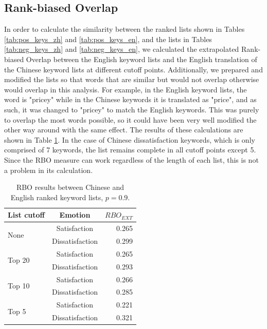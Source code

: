 \subsection{Rank-biased Overlap}\label{rboresults}

In order to calculate the similarity between the ranked lists shown in Tables \ref{tab:pos_keys_zh} and \ref{tab:pos_keys_en}, and the lists in Tables \ref{tab:neg_keys_zh} and \ref{tab:neg_keys_en}, we calculated the extrapolated Rank-biased Overlap between the English keyword lists and the English translation of the Chinese keyword lists at different cutoff points. Additionally, we prepared and modified the lists so that words that are similar but would not overlap otherwise would overlap in this analysis. For example, in the English keyword lists, the word is "pricey" while in the Chinese keywords it is translated as "price", and as such, it was changed to "pricey" to match the English keywords. This was purely to overlap the most words possible, so it could have been very well modified the other way around with the same effect. The results of these calculations are shown in Table \ref{tab:rbo}. In the case of Chinese dissatisfaction keywords, which is only comprised of 7 keywords, the list remains complete in all cutoff points except 5. Since the RBO measure can work regardless of the length of each list, this is not a problem in its calculation.

\begin{table}[hbp]
\centering
\caption{RBO results between Chinese and English ranked keyword lists, \(p=0.9\).}
\label{tab:rbo}
\begin{tabular}{|l|c|r|}
\hline
\multicolumn{1}{|c|}{\textbf{List cutoff}} & \textbf{Emotion} & \(RBO_{EXT}\) \\ \hline
\multirow{2}{*}{None}   & Satisfaction      & 0.265 \\ \cline{2-3} 
                        & Dissatisfaction   & 0.299 \\ \hline
\multirow{2}{*}{Top 20} & Satisfaction      & 0.265 \\ \cline{2-3} 
                        & Dissatisfaction   & 0.293 \\ \hline
\multirow{2}{*}{Top 10} & Satisfaction      & 0.266 \\ \cline{2-3} 
                        & Dissatisfaction   & 0.285 \\ \hline
\multirow{2}{*}{Top 5}  & Satisfaction      & 0.221 \\ \cline{2-3} 
                        & Dissatisfaction   & 0.321 \\ \hline
\end{tabular}
\end{table}

